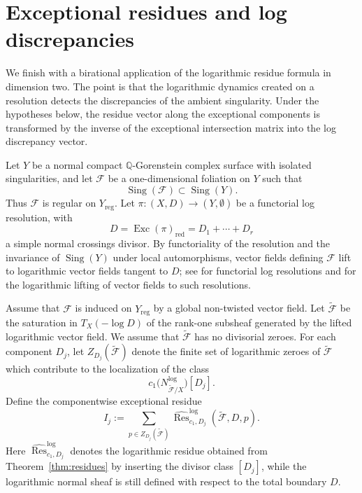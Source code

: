 \documentclass[12pt,reqno,a4paper]{amsart}
\numberwithin{equation}{section}
\theoremstyle{plain}
\theoremstyle{definition}
\DeclareMathOperator{\Sing}{Sing}
\newcommand{\cF}{\mathcal{F}}
\begin{document}
\section{Exceptional residues and log discrepancies}
\label{sec:exceptional-residues}

We finish with a birational application of the logarithmic residue formula in
dimension two. The point is that the logarithmic dynamics created on a
resolution detects the discrepancies of the ambient singularity. Under the
hypotheses below, the residue vector along the exceptional components is
transformed by the inverse of the exceptional intersection matrix into the log
discrepancy vector.

Let \(Y\) be a normal compact \(\mathbb Q\)-Gorenstein complex surface with
isolated singularities, and let \(\cF\) be a one-dimensional foliation on \(Y\)
such that
\[
\Sing(\cF)\subset \Sing(Y).
\]
Thus \(\cF\) is regular on \(Y_{\mathrm{reg}}\). Let
$
\pi:(X,D)\longrightarrow (Y,\emptyset)
$
be a functorial log resolution, with
$$
D=\operatorname{Exc}(\pi)_{\mathrm{red}}
=
D_1+\cdots+D_r
$$
a simple normal crossings divisor. By functoriality of the resolution and the
invariance of \(\Sing(Y)\) under local automorphisms, vector fields defining
\(\cF\) lift to logarithmic vector fields tangent to \(D\); see
\cite[Theorems~3.34, 3.35]{kollar07} for functorial log resolutions and
\cite[Corollary~4.7]{GKK10} for the logarithmic lifting of vector fields to such
resolutions.

Assume that \(\cF\) is induced on \(Y_{\mathrm{reg}}\) by a global non-twisted
vector field. Let \(\widetilde{\cF}\) be the saturation in \(T_X(-\log D)\) of
the rank-one subsheaf generated by the lifted logarithmic vector field. We
assume that \(\widetilde{\cF}\) has no divisorial zeroes. For each component \(D_j\), let \(Z_{D_j}(\widetilde{\cF})\) denote the finite
set of logarithmic zeroes of \(\widetilde{\cF}\) which contribute to the
localization of the class
\[
c_1\bigl(N^{\log}_{\widetilde{\cF}/X}\bigr)[D_j].
\]
Define the componentwise exceptional residue
\[
I_j:=
\sum_{p\in Z_{D_j}(\widetilde{\cF})}
\widehat{\operatorname{Res}}^{\log}_{c_1,D_j}
(\widetilde{\cF},D,p).
\]
Here
\(\widehat{\operatorname{Res}}^{\log}_{c_1,D_j}\) denotes the logarithmic residue
obtained from Theorem~\ref{thm:residues} by inserting the divisor class
\([D_j]\), while the logarithmic normal sheaf is still defined with respect to
the total boundary \(D\).
\end{document}
